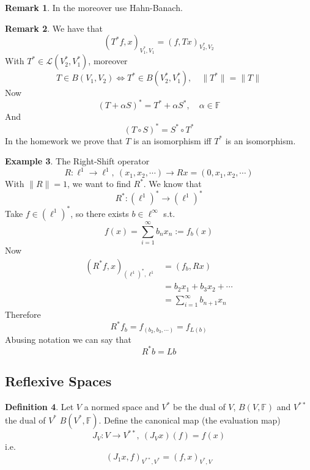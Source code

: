 \documentclass[11pt,a4paper]{article}
\theoremstyle{definition}
\newtheorem{definition}{Definition}[section]
\newtheorem{example}[definition]{Example}
\newtheorem{remark}[definition]{Remark}
\theoremstyle{plain}
\theoremstyle{remark}
\newcommand{\F}{\mathbb{F}}
\newcommand{\norm}[1]{\lVert #1 \rVert}
\newcommand{\1}{\mathbbm{1}}
\begin{document}
\begin{remark}
    In the moreover use Hahn-Banach.
\end{remark}

\begin{remark}
    We have that 
    $$(T^* f, x)_{V_1^*, V_1} = (f, Tx)_{V_2^*, V_2}$$
    With $T^* \in \mathcal{L}(V_2^*, V_1^*)$, moreover 
    $$T \in B(V_1, V_2) \iff T^* \in B(V_2^*, V_1^*), \quad \norm{T^*} = \norm{T}$$
    Now 
    $$(T + \alpha S)^* = T^* + \alpha S^*, \quad \alpha \in \F$$
    And 
    $$(T \circ S)^* = S^* \circ T^*$$ 
    In the homework we prove that $T$ is an isomorphism iff $T^*$ is an isomorphism. 
\end{remark}

\begin{example}
    The Right-Shift operator 
    $$R \colon \ell^1 \to \ell^1, \ (x_1, x_2, \cdots) \to Rx = (0, x_1, x_2, \cdots)$$
    With $\norm{R} = 1$, we want to find $R^*$. We know that 
    $$R^* \colon (\ell^1)^* \to (\ell^1)^*$$
    Take $f \in (\ell^1)^*$, so there exists $b \in \ell^\infty$ s.t. 
    $$f(x) = \sum_{i=1}^\infty b_n x_n := f_b(x)$$
    Now 
    \begin{align*}
        (R^*f, x)_{(\ell^1)^*, \ell^1} &= (f_b, Rx) \\
        &= b_2 x_1 + b_3 x_2 + \cdots \\
        &= \sum_{i=1}^\infty b_{n+1} x_n 
    \end{align*}
    Therefore 
    $$R^* f_b = f_{(b_2, b_3, \cdots)} = f_{L(b)}$$
    Abusing notation we can say that 
    $$R^* b = L b$$    
\end{example}

\subsection{Reflexive Spaces}

\begin{definition}
    Let $V$ a normed space and $V^*$ be the dual of $V$, $B(V, \F)$ and $V^{**}$ the dual of $V^*$ $B(V^*, \F)$. Define the canonical map (the evaluation map)
    $$J_V \colon V \to V^{**}, \ (J_V x)  (f) = f(x)$$
    i.e. 
    $$(J_1 x, f)_{V^{**}, V^*} = (f, x)_{V^*, V}$$
\end{definition}
\end{document}

